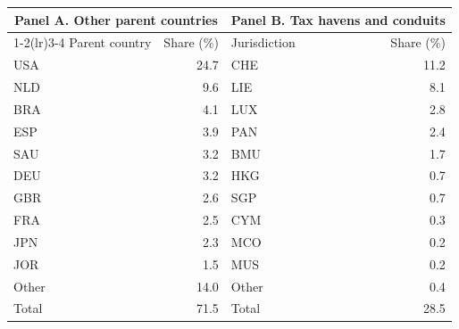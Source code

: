 \begin{tabular}{lrlr}
\toprule
\multicolumn{2}{c}{Panel A. Other parent countries} & \multicolumn{2}{c}{Panel B. Tax havens and conduits} \\
\cmidrule(lr){1-2}\cmidrule(lr){3-4}
Parent country & Share (\%) & Jurisdiction & Share (\%) \\
\midrule
USA & 24.7 & CHE & 11.2 \\
NLD & 9.6 & LIE & 8.1 \\
BRA & 4.1 & LUX & 2.8 \\
ESP & 3.9 & PAN & 2.4 \\
SAU & 3.2 & BMU & 1.7 \\
DEU & 3.2 & HKG & 0.7 \\
GBR & 2.6 & SGP & 0.7 \\
FRA & 2.5 & CYM & 0.3 \\
JPN & 2.3 & MCO & 0.2 \\
JOR & 1.5 & MUS & 0.2 \\
Other & 14.0 & Other & 0.4 \\
\midrule
Total & 71.5 & Total & 28.5 \\
\bottomrule
\end{tabular}

